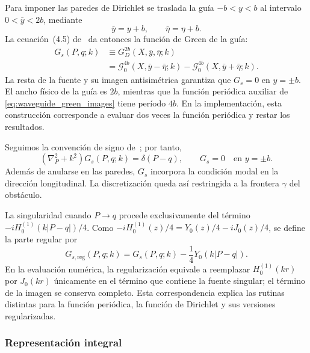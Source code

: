 \documentclass[11pt]{article}
\begin{document}
Para imponer las paredes de Dirichlet se traslada la guía
\(-b<y<b\) al intervalo \(0<\bar y<2b\), mediante
\begin{equation}
\bar y=y+b,
\qquad
\bar\eta=\eta+b.
\end{equation}
La ecuación~(4.5) de~\cite{Linton1998Green} da entonces la función de Green de la guía:
\begin{equation}
\begin{aligned}
G_s(P,q;k)
&\equiv
G_D^{2b}(X,\bar y,\bar\eta;k)\\
&=
\mathcal G_0^{4b}(X,\bar y-\bar\eta;k)
-
\mathcal G_0^{4b}(X,\bar y+\bar\eta;k).
\end{aligned}
\label{eq:waveguide_green_images}
\end{equation}
La resta de la fuente y su imagen antisimétrica garantiza que
\(G_s=0\) en \(y=\pm b\). El ancho físico de la guía es \(2b\), mientras
que la función periódica auxiliar de \eqref{eq:waveguide_green_images} tiene período
\(4b\). En la implementación, esta construcción corresponde a evaluar dos veces la función
periódica y restar los resultados.

Seguimos la convención de signo de~\cite{Linton1998Green}; por tanto,
\begin{equation}
\left(\nabla_P^2+k^2\right)G_s(P,q;k)=\delta(P-q),
\qquad
G_s=0\quad\text{en }y=\pm b.
\label{eq:waveguide_green_problem}
\end{equation}
Además de anularse en las paredes, \(G_s\) incorpora la condición modal en la dirección
longitudinal. La discretización queda así restringida a la frontera \(\gamma\) del obstáculo.

La singularidad cuando \(P\to q\) procede exclusivamente del término
\(-iH_0^{(1)}(k|P-q|)/4\). Como
\(-iH_0^{(1)}(z)/4=Y_0(z)/4-iJ_0(z)/4\), se define la parte regular por
\begin{equation}
G_{s,\mathrm{reg}}(P,q;k)
=
G_s(P,q;k)
-
\frac14Y_0\!\left(k|P-q|\right).
\label{eq:green_regularization}
\end{equation}
En la evaluación numérica, la regularización equivale a reemplazar
\(H_0^{(1)}(kr)\) por \(J_0(kr)\) únicamente en el término que contiene la fuente
singular; el término de la imagen se conserva completo. Esta correspondencia explica las
rutinas distintas para la función periódica, la función de Dirichlet y sus versiones
regularizadas.

\subsubsection{Representación integral}
\end{document}
